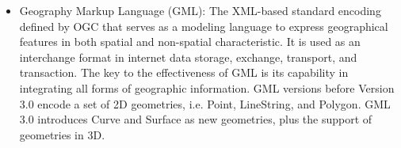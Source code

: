 \documentclass[a4paper,12pt]{article}
\begin{document}
\begin{itemize}


\item Geography Markup Language (GML): The XML-based standard encoding defined by OGC that serves as a modeling language to express geographical features in both spatial and non-spatial characteristic. It is used as an interchange format in internet data storage, exchange, transport, and transaction. The key to the effectiveness of GML is its capability in integrating all forms of geographic information. %
GML versions before Version 3.0 encode a set of 2D geometries, i.e. Point, LineString, and Polygon. GML 3.0 introduces Curve and Surface as new geometries, plus the support of geometries in 3D.


\end{itemize}
\end{document}

